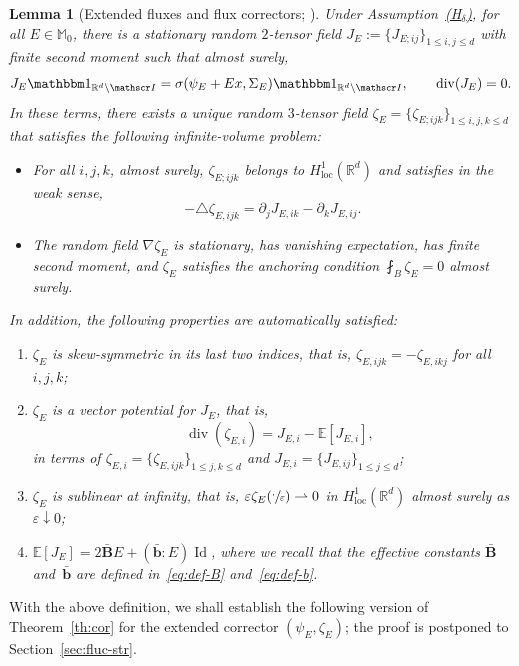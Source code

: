 \documentclass[JEP,XML,SOM,Unicode,published]{cedram}
\let\mathcal\mathscr
\newcommand{\Hd}{\hyperref[Hd]{\textup{(H$_\delta$)}}\xspace}
\let\mathds\mathbbm
\theoremstyle{plain}
\newtheorem{lem}[theor]{Lemma}
\theoremstyle{definition}
\newcommand{\e}{\varepsilon}
\newcommand{\R}{\mathbb R}
\newcommand{\Ic}{\mathcal I}
\newcommand{\Md}{\mathbb M}
\newcommand{\cvf}{\rightharpoonup}
\newcommand{\loc}{{\operatorname{loc}}}
\newcommand{\Id}{\operatorname{Id}}
\newcommand{\bb}{\bar{\boldsymbol b}}
\newcommand{\Bb}{\bar{\boldsymbol B}}
\newcommand{\Div}{{\operatorname{div}}}
\newcommand{\expec}[1]{\mathbb{E}\left[ #1 \right]}
\begin{document}
\begin{lem}[Extended fluxes and flux correctors; \cite{D-20}]\label{lem:ext-cor}
Under Assumption~\Hd, for all $E\in\Md_0$, there is a stationary random $2$-tensor field $J_E:=\{J_{E;ij}\}_{1\le i,j\le d}$ with finite second moment such that almost surely,
\begin{equation*}\label{eq:def-flux}
J_E\mathds1_{\R^d\setminus\Ic}=\sigma(\psi_E+Ex,\Sigma_E)\mathds1_{\R^d\setminus\Ic},\qquad \Div (J_E)=0.
\end{equation*}
In these terms, there exists a unique random $3$-tensor field $\zeta_E=\{\zeta_{E;ijk}\}_{1\le i,j,k\le d}$ that satisfies the following infinite-volume problem:
\begin{itemize}
\item For all $i,j,k$, almost surely, $\zeta_{E;ijk}$ belongs to $H^1_\loc(\R^d)$ and satisfies in the weak sense,
\begin{equation}\label{eq:def-zeta}
-\triangle \zeta_{E,ijk}=\partial_jJ_{E,ik}-\partial_kJ_{E,ij}.
\end{equation}
\item The random field $\nabla\zeta_E$ is stationary, has vanishing expectation, has finite second moment, and $\zeta_E$ satisfies the anchoring condition $\fint_B\zeta_E=0$ almost surely.
\end{itemize}
In addition, the following properties are automatically satisfied:
\begin{enumerate}\renewcommand{\theenumi}{\roman{enumi}}
\item\label{lem:ext-cori} $\zeta_E$ is skew-symmetric in its last two indices, that is, $\zeta_{E,ijk}=-\zeta_{E,ikj}$ for all $i,j,k$;
\item\label{lem:ext-corii} $\zeta_E$ is a vector potential for $J_E$, that is,
\[\quad\Div (\zeta_{E,i})=J_{E,i}-\expec{J_{E,i}},\]
in terms of $\zeta_{E,i}=\{\zeta_{E,ijk}\}_{1\le j,k\le d}$ and $J_{E,i}=\{J_{E,ij}\}_{1\le j\le d}$;
\item\label{lem:ext-coriii} $\zeta_E$ is sublinear at infinity, that is, $\e\zeta_E(\sfrac\cdot\e)\cvf{}0$ in $H^{1}_\loc(\R^d)$ almost surely as $\e\downarrow0$;
\item\label{lem:ext-coriv} $\expec{J_E}=2\Bb E+(\bb:E)\Id$, where we recall that the effective constants $\Bb$ and~$\bb$ are defined in~\eqref{eq:def-B} and~\eqref{eq:def-b}.
\qedhere
\end{enumerate}
\end{lem}

With the above definition, we shall establish the following version of Theorem~\ref{th:cor} for the extended corrector $(\psi_E,\zeta_E)$; the proof is postponed to Section~\ref{sec:fluc-str}.
\end{document}
